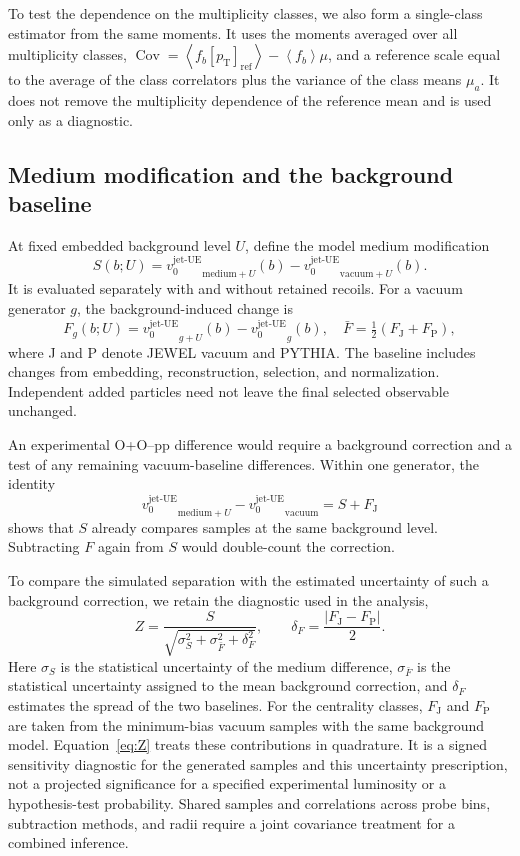 \documentclass[aps,prc,twocolumn,superscriptaddress,nofootinbib,longbibliography,floatfix,10pt]{revtex4-2}
\newcommand{\vjet}{{v_0^{\mathrm{jet\text{-}UE}}}}
\newcommand{\mpt}{[p_{\mathrm T}]_{\mathrm{ref}}}
\newcommand{\av}[1]{\left\langle #1\right\rangle}
\newcommand{\Cov}{\operatorname{Cov}}
\begin{document}
To test the dependence on the multiplicity classes, we also form a single-class estimator from the same moments. It uses the moments averaged over all multiplicity classes, $\Cov=\av{f_b\mpt}-\av{f_b}\mu$, and a reference scale equal to the average of the class correlators plus the variance of the class means $\mu_a$. It does not remove the multiplicity dependence of the reference mean and is used only as a diagnostic.

\subsection{Medium modification and the background baseline}
At fixed embedded background level $U$, define the model medium modification
\begin{equation}
 S(b;U)=\vjet_{\mathrm{medium}+U}(b)-\vjet_{\mathrm{vacuum}+U}(b).
 \label{eq:signal}
\end{equation}
It is evaluated separately with and without retained recoils. For a vacuum generator $g$, the background-induced change is
\begin{equation}
 F_g(b;U)=\vjet_{g+U}(b)-\vjet_g(b),\quad
 \bar F=\tfrac12(F_{\mathrm J}+F_{\mathrm P}),
 \label{eq:background}
\end{equation}
where J and P denote JEWEL vacuum and PYTHIA. The baseline includes changes from embedding, reconstruction, selection, and normalization. Independent added particles need not leave the final selected observable unchanged.

An experimental O+O--pp difference would require a background correction and a test of any remaining vacuum-baseline differences. Within one generator, the identity
\begin{equation}
 \vjet_{\mathrm{medium}+U}-\vjet_{\mathrm{vacuum}}
 =S+F_{\mathrm J}
 \label{eq:decomposition}
\end{equation}
shows that $S$ already compares samples at the same background level. Subtracting $F$ again from $S$ would double-count the correction.

To compare the simulated separation with the estimated uncertainty of such a background correction, we retain the diagnostic used in the analysis,
\begin{equation}
 Z=\frac{S}{\sqrt{\sigma_S^2+\sigma_{\bar F}^2+\delta_F^2}},\qquad
 \delta_F=\frac{|F_{\mathrm J}-F_{\mathrm P}|}{2}.
 \label{eq:Z}
\end{equation}
Here $\sigma_S$ is the statistical uncertainty of the medium difference, $\sigma_{\bar F}$ is the statistical uncertainty assigned to the mean background correction, and $\delta_F$ estimates the spread of the two baselines. For the centrality classes, $F_{\mathrm J}$ and $F_{\mathrm P}$ are taken from the minimum-bias vacuum samples with the same background model. Equation~\eqref{eq:Z} treats these contributions in quadrature. It is a signed sensitivity diagnostic for the generated samples and this uncertainty prescription, not a projected significance for a specified experimental luminosity or a hypothesis-test probability. Shared samples and correlations across probe bins, subtraction methods, and radii require a joint covariance treatment for a combined inference.
\end{document}
